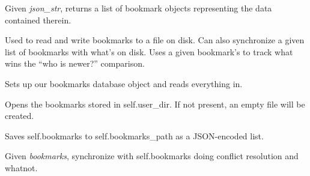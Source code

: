 \documentclass[letterpaper,10pt,openany]{sphinxmanual}
\begin{document}

\begin{fulllineitems}
\label{Applications/terminal/plugin_bookmarks:bookmarks.parse_bookmarks_json}
Given \emph{json\_str}, returns a list of bookmark objects representing the data
contained therein.

\end{fulllineitems}


\begin{fulllineitems}
\label{Applications/terminal/plugin_bookmarks:bookmarks.BookmarksDB}
Used to read and write bookmarks to a file on disk.  Can also synchronize
a given list of bookmarks with what's on disk.  Uses a given bookmark's
 to track what wins the ``who is newer?'' comparison.

Sets up our bookmarks database object and reads everything in.

\begin{fulllineitems}
\label{Applications/terminal/plugin_bookmarks:bookmarks.BookmarksDB.open_bookmarks}
Opens the bookmarks stored in self.user\_dir.  If not present, an
empty file will be created.

\end{fulllineitems}


\begin{fulllineitems}
\label{Applications/terminal/plugin_bookmarks:bookmarks.BookmarksDB.save_bookmarks}
Saves self.bookmarks to self.bookmarks\_path as a JSON-encoded list.

\end{fulllineitems}


\begin{fulllineitems}
\label{Applications/terminal/plugin_bookmarks:bookmarks.BookmarksDB.sync_bookmarks}
Given \emph{bookmarks}, synchronize with self.bookmarks doing conflict
resolution and whatnot.


\end{fulllineitems}
\end{fulllineitems}
\end{document}
